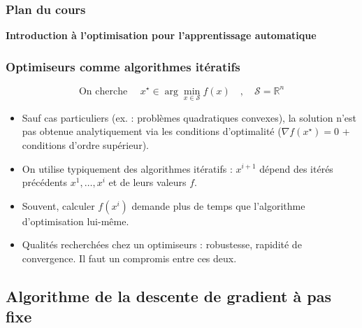 \documentclass[12pt]{beamer}
\begin{document}
\begin{frame}%
\frametitle{Plan du cours} 
\begin{multicols}{2}
\begin{center} \textbf{Introduction à l’optimisation pour l’apprentissage automatique} \end{center}
\tableofcontents[currentsection]
\end{multicols}
\end{frame}


\begin{frame}
\frametitle{Optimiseurs comme algorithmes itératifs} 
\begin{equation*}
\text{On cherche } \quad  x^\star \in \arg\min_{x \in \mathcal S} f(x) \quad,\quad \mathcal S = \mathbb{R}^n
\end{equation*}
\begin{itemize}
\item Sauf cas particuliers (ex. : problèmes quadratiques convexes), la solution n’est pas obtenue analytiquement via les conditions d’optimalité ($\nabla f(x^\star) = 0$ + conditions d’ordre supérieur).
\item On utilise typiquement des algorithmes itératifs : $x^{i+1}$ dépend des itérés précédents $x^1, \ldots, x^i$ et de leurs valeurs $f$.
\item Souvent, calculer $f(x^i)$ demande plus de temps que l’algorithme d’optimisation lui-même.
\item Qualités recherchées chez un optimiseurs : robustesse, rapidité de convergence. Il faut un compromis entre ces deux.
\end{itemize}
\end{frame}

\subsection{Algorithme de la descente de gradient à pas fixe}
\end{document}
